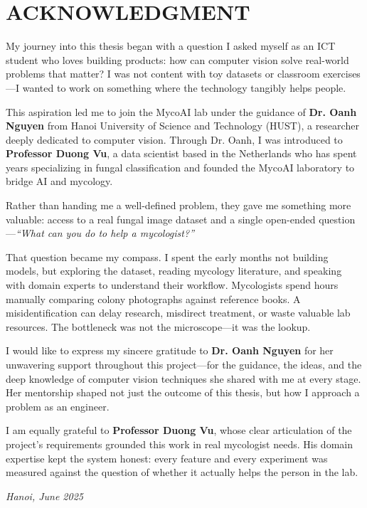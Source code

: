 \newpage
\section*{ACKNOWLEDGMENT}

My journey into this thesis began with a question I asked myself as an ICT student who loves building products: how can computer vision solve real-world problems that matter? I was not content with toy datasets or classroom exercises---I wanted to work on something where the technology tangibly helps people.

This aspiration led me to join the MycoAI lab under the guidance of \textbf{Dr. Oanh Nguyen} from Hanoi University of Science and Technology (HUST), a researcher deeply dedicated to computer vision. Through Dr. Oanh, I was introduced to \textbf{Professor Duong Vu}, a data scientist based in the Netherlands who has spent years specializing in fungal classification and founded the MycoAI laboratory to bridge AI and mycology.

Rather than handing me a well-defined problem, they gave me something more valuable: access to a real fungal image dataset and a single open-ended question---\textit{``What can you do to help a mycologist?''}

That question became my compass. I spent the early months not building models, but exploring the dataset, reading mycology literature, and speaking with domain experts to understand their workflow. Mycologists spend hours manually comparing colony photographs against reference books. A misidentification can delay research, misdirect treatment, or waste valuable lab resources. The bottleneck was not the microscope---it was the lookup.

I would like to express my sincere gratitude to \textbf{Dr. Oanh Nguyen} for her unwavering support throughout this project---for the guidance, the ideas, and the deep knowledge of computer vision techniques she shared with me at every stage. Her mentorship shaped not just the outcome of this thesis, but how I approach a problem as an engineer.

I am equally grateful to \textbf{Professor Duong Vu}, whose clear articulation of the project's requirements grounded this work in real mycologist needs. His domain expertise kept the system honest: every feature and every experiment was measured against the question of whether it actually helps the person in the lab.

\vspace{1cm}
\begin{flushright}
\textit{Hanoi, June 2025}
\end{flushright}
